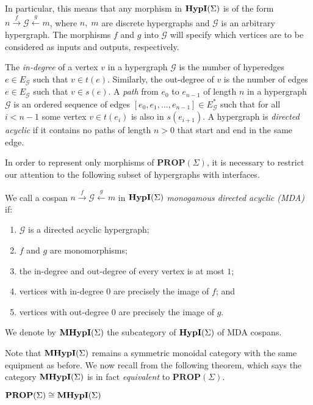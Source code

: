 In particular, this means that any morphism in $\textbf{HypI}(\Sigma)$ is of the form $n \xrightarrow{f} \mathcal{G} \xleftarrow{g} m$,
where $n,\;m$ are discrete hypergraphs and $\mathcal{G}$ is an arbitrary hypergraph.  The morphisms $f$ and $g$ into $\mathcal{G}$ will specify which vertices are to be considered as inputs and outputs,  respectively.   

\begin{definition} 
The \emph{in-degree} of a vertex $v$ in a hypergraph $\mathcal{G}$ is the number of hyperedges $e \in {E_\mathcal{G}}$ such that $v \in t(e)$.  
Similarly, the out-degree of $v$ is the number of edges $e \in E_\mathcal{G}$ such that $v \in s(e)$.
A \emph{path} from $e_0$ to $e_{n-1}$ of length $n$ in a hypergraph $\mathcal{G}$ is an ordered sequence of edges $[e_0, e_1, \ldots, e_{n-1}] \in E_\mathcal{G}^*$ such that for all $i < n - 1$ some vertex $v \in t(e_i)$ is also in $s(e_{i+1})$.
A hypergraph is \emph{directed acyclic} if it contains no paths of length $n > 0$ that start and end in the same edge.
\end{definition}

In order to represent only morphisms of $\textbf{PROP}(\Sigma)$,  it is necessary to restrict our attention to the following subset of hypergraphs with interfaces. 
\begin{definition}
\label{def:monogamy_hyp}
We call a cospan $n \xrightarrow{f} \mathcal{G} \xleftarrow{g} m$ in $\textbf{HypI}(\Sigma)$ \emph{monogamous directed acyclic (MDA)} if:
\begin{enumerate}
    \item $\mathcal{G}$ is a directed acyclic hypergraph;
    \item $f$ and $g$ are monomorphisms;
    \item the in-degree and out-degree of every vertex is at most $1$;
    \item vertices with in-degree $0$ are precisely the image of $f$; and
    \item vertices with out-degree $0$ are precisely the image of $g$.
\end{enumerate}
We denote by $\textbf{MHypI}(\Sigma)$ the subcategory of $\textbf{HypI}(\Sigma)$ of MDA cospans. 
\end{definition}
Note that $\textbf{MHypI}(\Sigma)$ remains a symmetric monoidal category with the same equipment as before.  We now recall from
\cite{bonchi_string_2022-2} the following theorem,  which says the category $\textbf{MHypI}(\Sigma)$ is in fact \textit{equivalent} to $\textbf{PROP}(\Sigma)$. 
\begin{theorem}\label{thm:prop-equiv}
    $\textbf{PROP}(\Sigma) \cong \textbf{MHypI}(\Sigma)$
\end{theorem}

